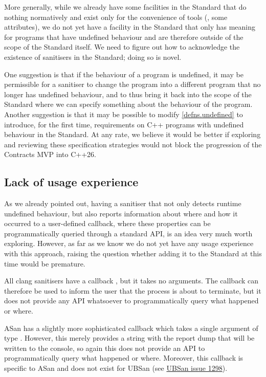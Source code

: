 More generally, while we already have some facilities in the Standard that do nothing normatively and exist only for the convenience of tools (, some attributes), we do not yet have a facility in the Standard that only has meaning for programs that have undefined behaviour and are therefore outside of the scope of the Standard itself. We need to figure out how to acknowledge the existence of sanitisers in the Standard; doing so is novel.

One suggestion is that if the behaviour of a program is undefined, it may be permissible for a sanitiser to change the program into a different program that no longer has undefined behaviour, and to thus bring it back into the scope of the Standard where we can specify something about the behaviour of the program. Another suggestion is that it may be possible to modify \href{https://eel.is/c++draft/defns.undefined}{[defns.undefined]} to introduce, for the first time, requirements on C++ programs with undefined behaviour in the Standard. At any rate, we believe it would be better if exploring and reviewing these specification strategies would not block the progression of the Contracts MVP into C++26.

\subsection{Lack of usage experience}

As we already pointed out, having a sanitiser that not only detects runtime undefined behaviour, but also reports information about where and how it occurred to a user-defined callback, where these properties can be programmatically queried through a standard API, is an idea very much worth exploring. However, as far as we know we do not yet have any usage experience with this approach, raising the question whether adding it to the Standard at this time would be premature.

All clang sanitisers have a callback , but it takes no arguments. The callback can therefore be used to inform the user that the process is about to terminate, but it does not provide any API whatsoever to programmatically query what happened or where.

ASan has a slightly more sophisticated callback  which takes a single argument of type . However, this merely provides a string with the report dump that will be written to the console, so again this does not provide an API to programmatically query what happened or where. Moreover, this callback is specific to ASan and does not exist for UBSan (see \href{ https://github.com/google/sanitizers/issues/1298}{UBSan issue 1298}).

